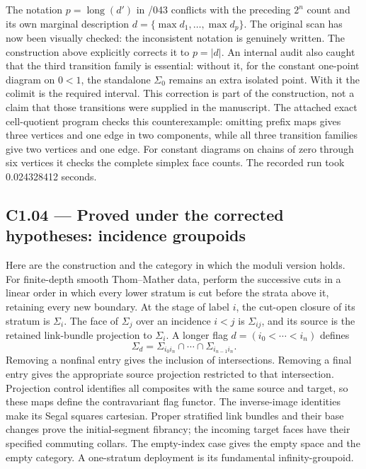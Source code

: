 The notation \(p=\operatorname{long}(d')\) in /043 conflicts with the preceding \(2^n\) count and its own marginal description \(d=\{\max d_1,\ldots,\max d_p\}\). The original scan has now been visually checked: the inconsistent notation is genuinely written. The construction above explicitly corrects it to \(p=|d|\). An internal audit also caught that the third transition family is essential: without it, for the constant one-point diagram on \(0<1\), the standalone \(\Sigma_0\) remains an extra isolated point. With it the colimit is the required interval. This correction is part of the construction, not a claim that those transitions were supplied in the manuscript. The attached exact cell-quotient program checks this counterexample: omitting prefix maps gives three vertices and one edge in two components, while all three transition families give two vertices and one edge. For constant diagrams on chains of zero through six vertices it checks the complete simplex face counts. The recorded run took 0.024328412 seconds.



\subsection{C1.04 --- Proved under the corrected hypotheses: incidence groupoids}\label{c1.04-proved-under-the-corrected-hypotheses-incidence-groupoids}

Here are the construction and the category in which the moduli version holds. For finite-depth smooth Thom--Mather data, perform the successive cuts in a linear order in which every lower stratum is cut before the strata above it, retaining every new boundary. At the stage of label \(i\), the cut-open closure of its stratum is \(\Sigma_i\). The face of \(\Sigma_j\) over an incidence \(i<j\) is \(\Sigma_{ij}\), and its source is the retained link-bundle projection to \(\Sigma_i\). A longer flag \(d=(i_0<\cdots<i_n)\) defines \[
 \Sigma_d=\Sigma_{i_0i_n}\cap\cdots\cap\Sigma_{i_{n-1}i_n}.
\] Removing a nonfinal entry gives the inclusion of intersections. Removing a final entry gives the appropriate source projection restricted to that intersection. Projection control identifies all composites with the same source and target, so these maps define the contravariant flag functor. The inverse-image identities make its Segal squares cartesian. Proper stratified link bundles and their base changes prove the initial-segment fibrancy; the incoming target faces have their specified commuting collars. The empty-index case gives the empty space and the empty category. A one-stratum deployment is its fundamental infinity-groupoid.

